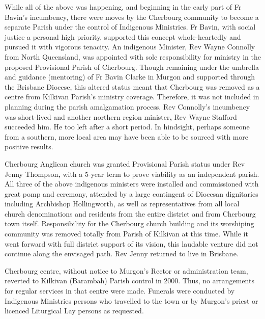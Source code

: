 While all of the above was happening, and beginning in the early part of Fr Bavin's incumbency, there were moves by the Cherbourg community to become a separate Parish under the control of Indigenous Ministries. Fr Bavin, with social justice a personal high priority, supported this concept whole-heartedly and pursued it with vigorous tenacity. An indigenous Minister, Rev Wayne Connolly from North Queensland, was appointed with sole responsibility for ministry in the proposed Provisional Parish of Cherbourg. Though remaining under the umbrella and guidance (mentoring) of Fr Bavin Clarke in Murgon and supported through the Brisbane Diocese, this altered status meant that Cherbourg was removed as a centre from Kilkivan Parish's ministry coverage. Therefore, it was not included in planning during the parish amalgamation process. Rev Connolly's incumbency was short-lived and another northern region minister\textbf{,} Rev Wayne Stafford succeeded him. He too left after a short period. In hindsight, perhaps someone from a southern, more local area may have been able to be sourced with more positive results.

Cherbourg Anglican church was granted Provisional Parish status under Rev Jenny Thompson\textbf{,} with a 5-year term to prove viability as an independent parish. All three of the above indigenous ministers were installed and commissioned with great pomp and ceremony, attended by a large contingent of Diocesan dignitaries including Archbishop Hollingworth, as well as representatives from all local church denominations and residents from the entire district and from Cherbourg town itself. Responsibility for the Cherbourg church building and its worshiping community was removed totally from Parish of Kilkivan at this time. While it went forward with full district support of its vision, this laudable venture did not continue along the envisaged path. Rev Jenny returned to live in Brisbane.

Cherbourg centre, without notice to Murgon's Rector or administration team, reverted to Kilkivan (Barambah) Parish control in 2000. Thus, no arrangements for regular services in that centre were made. Funerals were conducted by Indigenous Ministries persons who travelled to the town or by Murgon's priest or licenced Liturgical Lay persons as requested.

